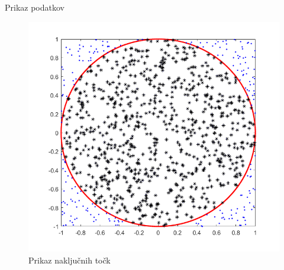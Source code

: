\begin{frame}{Prikaz podatkov}
     
        \begin{figure}[htb]
            \begin{center}
                \includegraphics[width=0.6 \textwidth]{Slike/graf_krog.png}
            \end{center}
            \caption{Prikaz naključnih točk}
            \label{fig:figure1}
        \end{figure}
    
\end{frame}